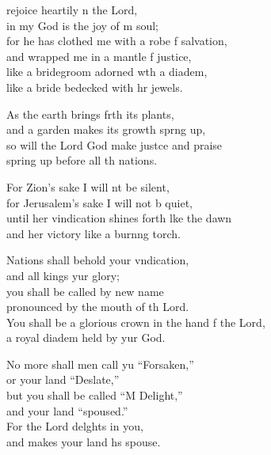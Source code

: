\settowidth{\versewidth}{You shall be a glorious crown in the hand of the Lord, *}
\begin{psalmverse}%
  \begin{patverse}
 rejoice heartily \pointup{\i}n the Lord,\Med\\
in my God is the joy of m soul;\\
for he has clothed me with a robe f salvation,\Med\\
and wrapped me in a mantle f justice,\\
like a bridegroom adorned w\pointup{\i}th a diadem,\Med\\
like a bride bedecked with hr jewels.

As the earth brings frth its plants,\Med\\
and a garden makes its growth spr\pointup{\i}ng up,\\
so will the Lord God make just\pointup{\i}ce and praise\Med\\
spring up before all th nations.

For Zion’s sake I will nt be silent,\Med\\
for Jerusalem’s sake I will not b quiet,\\
until her vindication shines forth l\pointup{\i}ke the dawn\Med\\
and her victory like a burn\pointup{\i}ng torch.

Nations shall behold your v\pointup{\i}ndication,\Med\\
and all kings yur glory;\\
you shall be called by  new name\Med\\
pronounced by the mouth of th Lord.\\
You shall be a glorious crown in the hand f the Lord,\Med\\
a royal diadem held by yur God.

No more shall men call yu “Forsaken,”\Med\\
or your land “Deslate,”\\
but you shall be called “M Delight,”\Med\\
and your land “spoused.”\\
For the Lord del\pointup{\i}ghts in you,\Med\\
and makes your land h\pointup{\i}s spouse.


\end{patverse}
\end{psalmverse}
